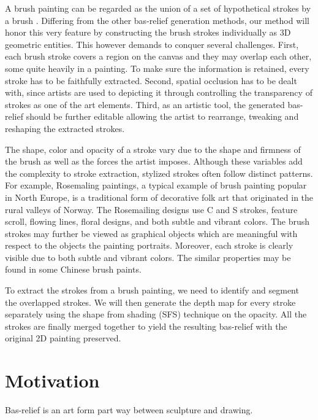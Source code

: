 A brush painting can be regarded as the union of a set of hypothetical strokes by a brush \cite{xu2006animating}. Differing from the other bas-relief generation methods, our method will honor this very feature by constructing the brush strokes individually as 3D geometric entities. This however demands to conquer several challenges. First, each brush stroke covers a region on the canvas and they may overlap each other, some quite heavily in a painting. To make sure the information is retained, every stroke has to be faithfully extracted. Second, spatial occlusion has to be dealt with, since artists are used to depicting it through controlling the transparency of strokes as one of the art elements. Third, as an artistic tool, the generated bas-relief should be further editable allowing the artist to rearrange, tweaking and reshaping the extracted strokes.

The shape, color and opacity of a stroke vary due to the shape and firmness of the brush as well as the forces the artist imposes. Although these variables add the complexity to stroke extraction, stylized strokes often follow distinct patterns. For example, Rosemaling paintings, a typical example of brush painting popular in North Europe, is a traditional form of decorative folk art that originated in the rural valleys of Norway. The Rosemailing designs use C and S strokes, feature scroll, flowing lines, floral designs, and both subtle and vibrant colors. The brush strokes may further be viewed as graphical objects which are meaningful with respect to the objects the painting portraits. Moreover, each stroke is clearly visible due to both subtle and vibrant colors. The similar properties may be found in some Chinese brush paints.

To extract the strokes from a brush painting, we need to identify and segment the overlapped strokes. We will then generate the depth map for every stroke separately using the shape from shading (SFS) technique on the opacity. All the strokes are finally merged together to yield the resulting bas-relief with the original 2D painting preserved. 

\section{Motivation}
Bas-relief is an art form part way between sculpture and drawing. \cite{zeng2014region} 


